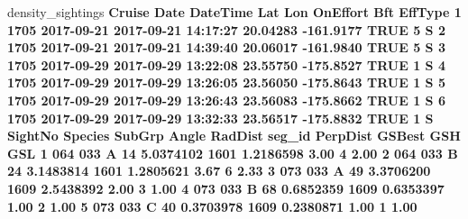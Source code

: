 \documentclass[
]{book}
\newenvironment{Shaded}{\begin{snugshade}}{\end{snugshade}}
\newcommand{\DecValTok}[1]{\textcolor[rgb]{0.00,0.00,0.81}{#1}}
\newcommand{\FloatTok}[1]{\textcolor[rgb]{0.00,0.00,0.81}{#1}}
\newcommand{\NormalTok}[1]{#1}
\newcommand{\OperatorTok}[1]{\textcolor[rgb]{0.81,0.36,0.00}{\textbf{#1}}}
\newcommand{\OtherTok}[1]{\textcolor[rgb]{0.56,0.35,0.01}{#1}}
\newcommand{\StringTok}[1]{\textcolor[rgb]{0.31,0.60,0.02}{#1}}
\begin{document}
\begin{Shaded}
\begin{Highlighting}[]
{{\NormalTok{density_sightings }\OperatorTok{%
\NormalTok{  Cruise       Date            DateTime      Lat       Lon OnEffort Bft EffType}
\DecValTok{1}   \DecValTok{1705} \DecValTok{2017-09-21} \DecValTok{2017-09-21} \DecValTok{14}\OperatorTok{:}\DecValTok{17}\OperatorTok{:}\DecValTok{27} \FloatTok{20.04283} \FloatTok{-161.9177}     \OtherTok{TRUE}   \DecValTok{5}\NormalTok{       S}
\DecValTok{2}   \DecValTok{1705} \DecValTok{2017-09-21} \DecValTok{2017-09-21} \DecValTok{14}\OperatorTok{:}\DecValTok{39}\OperatorTok{:}\DecValTok{40} \FloatTok{20.06017} \FloatTok{-161.9840}     \OtherTok{TRUE}   \DecValTok{5}\NormalTok{       S}
\DecValTok{3}   \DecValTok{1705} \DecValTok{2017-09-29} \DecValTok{2017-09-29} \DecValTok{13}\OperatorTok{:}\DecValTok{22}\OperatorTok{:}\DecValTok{08} \FloatTok{23.55750} \FloatTok{-175.8527}     \OtherTok{TRUE}   \DecValTok{1}\NormalTok{       S}
\DecValTok{4}   \DecValTok{1705} \DecValTok{2017-09-29} \DecValTok{2017-09-29} \DecValTok{13}\OperatorTok{:}\DecValTok{26}\OperatorTok{:}\DecValTok{05} \FloatTok{23.56050} \FloatTok{-175.8643}     \OtherTok{TRUE}   \DecValTok{1}\NormalTok{       S}
\DecValTok{5}   \DecValTok{1705} \DecValTok{2017-09-29} \DecValTok{2017-09-29} \DecValTok{13}\OperatorTok{:}\DecValTok{26}\OperatorTok{:}\DecValTok{43} \FloatTok{23.56083} \FloatTok{-175.8662}     \OtherTok{TRUE}   \DecValTok{1}\NormalTok{       S}
\DecValTok{6}   \DecValTok{1705} \DecValTok{2017-09-29} \DecValTok{2017-09-29} \DecValTok{13}\OperatorTok{:}\DecValTok{32}\OperatorTok{:}\DecValTok{33} \FloatTok{23.56517} \FloatTok{-175.8832}     \OtherTok{TRUE}   \DecValTok{1}\NormalTok{       S}
\NormalTok{  SightNo Species SubGrp Angle   RadDist seg_id  PerpDist GSBest GSH  GSL}
\DecValTok{1}     \DecValTok{064}     \DecValTok{033}\NormalTok{      A    }\DecValTok{14} \FloatTok{5.0374102}   \DecValTok{1601} \FloatTok{1.2186598}   \FloatTok{3.00}   \DecValTok{4} \FloatTok{2.00}
\DecValTok{2}     \DecValTok{064}     \DecValTok{033}\NormalTok{      B    }\DecValTok{24} \FloatTok{3.1483814}   \DecValTok{1601} \FloatTok{1.2805621}   \FloatTok{3.67}   \DecValTok{6} \FloatTok{2.33}
\DecValTok{3}     \DecValTok{073}     \DecValTok{033}\NormalTok{      A    }\DecValTok{49} \FloatTok{3.3706200}   \DecValTok{1609} \FloatTok{2.5438392}   \FloatTok{2.00}   \DecValTok{3} \FloatTok{1.00}
\DecValTok{4}     \DecValTok{073}     \DecValTok{033}\NormalTok{      B    }\DecValTok{68} \FloatTok{0.6852359}   \DecValTok{1609} \FloatTok{0.6353397}   \FloatTok{1.00}   \DecValTok{2} \FloatTok{1.00}
\DecValTok{5}     \DecValTok{073}     \DecValTok{033}\NormalTok{      C    }\DecValTok{40} \FloatTok{0.3703978}   \DecValTok{1609} \FloatTok{0.2380871}   \FloatTok{1.00}   \DecValTok{1} \FloatTok{1.00}
}}}
\end{Highlighting}
\end{Shaded}
\end{document}
